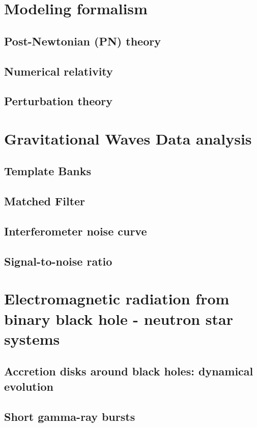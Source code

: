 \documentclass[binding=0.6cm, LaM]{sapthesis}
\begin{document}
\chapter{Modeling formalism}
\section{Post-Newtonian (PN) theory}
\section{Numerical relativity}
\section{Perturbation theory}


\chapter{Gravitational Waves Data analysis}
\section{Template Banks}
\section{Matched Filter}
\section{Interferometer noise curve}
\section{Signal-to-noise ratio}

\chapter{Electromagnetic radiation from binary black hole - neutron star systems}
\section{Accretion disks around black holes: dynamical evolution}
\section{Short gamma-ray bursts}
\section{} 





\backmatter
\cleardoublepage


\begin{thebibliography}{100}
\end{thebibliography}
\end{document}
